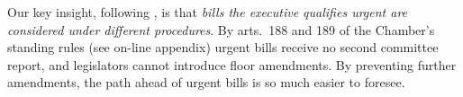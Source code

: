 \documentclass[letter,12pt]{article}
\begin{document}
  
Our key insight, following \citet{sotoCongChile2015}, is that \emph{bills the executive qualifies urgent are considered under different procedures}. By arts.~188 and 189 of the Chamber's standing rules (see on-line appendix) urgent bills receive no second committee report, and legislators cannot introduce floor amendments. By preventing further amendments, the path ahead of urgent bills is so much easier to foresee.
\end{document}

